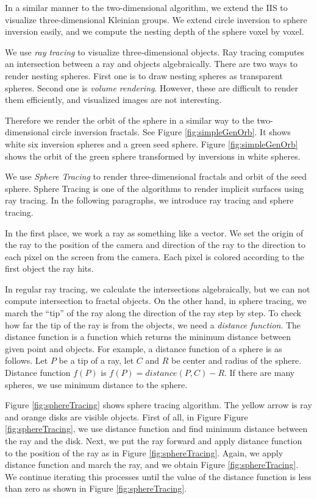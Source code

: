 In a similar manner to the two-dimensional algorithm,
we extend the IIS to visualize three-dimensional Kleinian groups.
We extend circle inversion to sphere inversion easily, and we
compute the nesting depth of the sphere voxel by voxel.

We use \textit{ray tracing} to visualize three-dimensional objects.
Ray tracing computes an intersection between a ray and objects
algebraically.
There are two ways to render nesting spheres. First one is to draw
nesting spheres as transparent spheres.
Second one is \textit{volume rendering}.
However, these are difficult to render them efficiently, and
visualized images are not interesting.

Therefore we render the orbit of the sphere in a similar way to the
two-dimensional circle inversion fractals.
See Figure \ref{fig:simpleGenOrb}. It shows
white six inversion spheres and a green seed sphere.
Figure \ref{fig:simpleGenOrb} shows the orbit of
the green sphere transformed by inversions in white spheres.

We use \textit{Sphere Tracing} \cite{hart1996sphere} to render three-dimensional
fractals and orbit of the seed sphere.
Sphere Tracing is one of the algorithms to render implicit surfaces using
ray tracing.
In the following paragraphs, we introduce ray tracing and
sphere tracing.

In the first place, we work a ray as something like a vector.
We set the origin of the ray to the position of the camera
and direction of the ray to the direction to each pixel on the screen
from the camera. Each pixel is colored according to the
first object the ray hits. 

In regular ray tracing, we calculate the intersections algebraically, but
we can not compute intersection to fractal objects.
On the other hand, in sphere tracing, we march the ``tip'' of the ray
along the direction of the ray step by step. 
To check how far the tip of the ray is from the objects, we need a
\textit{distance function}.
The distance function is a function which returns the minimum distance
between given point and objects.
For example, a distance function of a sphere is as follows.
Let $P$ be a tip of a ray, let $C$ and $R$ be center and
radius of the sphere.
Distance function $f(P)$ is $f(P) = distance(P, C) - R$.
If there are many spheres, we use minimum distance to the sphere.

Figure \ref{fig:sphereTracing} shows sphere tracing algorithm.
The yellow arrow is ray and orange disks are visible objects.
First of all, in Figure Figure \ref{fig:sphereTracing},
we use distance function and find minimum distance between
the ray and the disk.
Next, we put the ray forward and apply distance function to the position
of the ray as in Figure \ref{fig:sphereTracing}.
Again, we apply distance function and march the ray, and we obtain
Figure \ref{fig:sphereTracing}.
We continue iterating this processes until the value of the distance
function is less than zero as shown in Figure \ref{fig:sphereTracing}.

